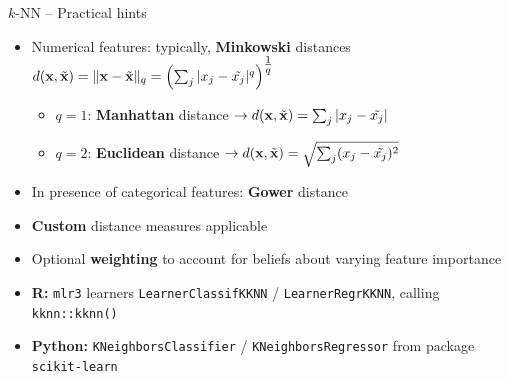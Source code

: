 
\begin{frame}{$k$-NN -- Practical hints}


\begin{itemize}
  \item Numerical features: typically, \textbf{Minkowski} distances
  $d(\mathbf{x}, \tilde{\mathbf{x}}) = \|\mathbf{x} - \tilde{\mathbf{x}} \|_q = 
  \left( \sum_j | x_j - \tilde{x_j} |^q
  \right)^{\tfrac{1}{q}}$
  \begin{itemize}
    \item $q = 1$: \textbf{Manhattan} distance $\rightarrow d(\mathbf{x}, \tilde{\mathbf{x}}) =
    \sum_j | x_j - \tilde{x_j} |$
  \item $q = 2$: \textbf{Euclidean} distance $\rightarrow d(\mathbf{x}, \tilde{\mathbf{x}}) =
  \sqrt{\sum_j (x_j - \tilde{x_j})^2}$
  \end{itemize}
  \item In presence of categorical features: \textbf{Gower} distance
  \item \textbf{Custom} distance measures applicable
  \item Optional \textbf{weighting} to account for beliefs about varying feature
  importance
\end{itemize}

\medskip

\begin{itemize}
  \item \textbf{R:} \texttt{mlr3} learners \texttt{LearnerClassifKKNN} /
  \texttt{LearnerRegrKKNN}, calling \texttt{kknn::kknn()}
  \item \textbf{Python:} \texttt{KNeighborsClassifier} / 
  \texttt{KNeighborsRegressor} from package \texttt{scikit-learn}
\end{itemize}

\end{frame}


